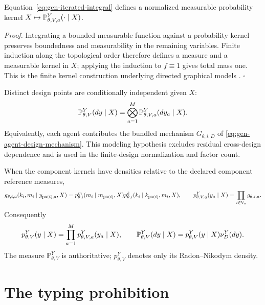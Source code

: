 \medskip
{}
Equation~\eqref{eq:gen-iterated-integral} defines a normalized measurable probability kernel
$X\mapsto\mathbb P_{\theta,V,a}^{Y}(\cdot\mid X)$. 
\medskip

\noindent\emph{Proof.}
Integrating a bounded measurable function against a probability kernel preserves boundedness and
measurability in the remaining variables. Finite induction along the topological order therefore
defines a measure and a measurable kernel in $X$; applying the induction to $f\equiv1$ gives total
mass one. This is the finite kernel construction underlying directed graphical models
\citep{Klenke2020,Lauritzen1996,Wainwright2008}. \hfill$\square$

Distinct design points are conditionally independent given $X$:
\begin{equation}
\mathbb P_{\theta,V}^{Y}(dy\mid X)
=\bigotimes_{a=1}^{M}\mathbb P_{\theta,V,a}^{Y}(dy_a\mid X).
\label{eq:gen-design-product}
\end{equation}
Equivalently, each agent contributes the bundled mechanism $G_{\theta,i,D}$ of
\eqref{eq:gen-agent-design-mechanism}. This modeling hypothesis excludes residual cross-design
dependence and is used in the finite-design normalization and factor count.
\label{hyp:gen-design-product}

When the component kernels have densities relative to the declared component reference measures,
\begin{equation}
g_{\theta,i,a}(k_i,m_i\mid y_{\operatorname{pa}(i),a},X)
=p_{\theta,i}^{m}(m_i\mid m_{\operatorname{pa}(i)},X)
p_{\theta,i}^{k}(k_i\mid k_{\operatorname{pa}(i)},m_i,X),
\qquad
p_{\theta,V,a}^{Y}(y_a\mid X)=\prod_{i\in V_a}g_{\theta,i,a}.
\label{eq:gen-density}
\end{equation}
Consequently
\begin{equation}
p_{\theta,V}^{Y}(y\mid X)=\prod_{a=1}^{M}p_{\theta,V,a}^{Y}(y_a\mid X),
\qquad
\mathbb P_{\theta,V}^{Y}(dy\mid X)
=p_{\theta,V}^{Y}(y\mid X)\nu_D^Y(dy).
\label{eq:gen-design-density}
\end{equation}
The measure $\mathbb P_{\theta,V}^{Y}$ is authoritative; $p_{\theta,V}^{Y}$ denotes only its
Radon--Nikodym density.

\section{The typing prohibition}
\label{sec:gen-typing}

